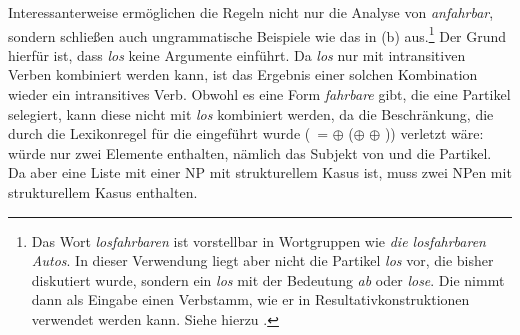 Interessanterweise ermöglichen die Regeln nicht nur die Analyse von \emph{anfahrbar}, sondern
schließen auch ungrammatische Beispiele wie das in (b) aus.\footnote{
  Das Wort \emph{losfahrbaren} ist vorstellbar in Wortgruppen wie \emph{die losfahrbaren Autos}.
  In dieser Verwendung liegt aber nicht die Partikel \emph{los} vor, die bisher diskutiert
  wurde, sondern ein \emph{los} mit der Bedeutung \emph{ab} oder \emph{lose}. Die \bard
  nimmt dann als Eingabe einen Verbstamm, wie er in
  Resultativkonstruktionen verwendet werden 
  kann. Siehe hierzu .%
}
\eal
{}
\zl
Der Grund hierfür ist, dass \emph{los} keine Argumente einführt. Da \emph{los} nur mit intransitiven
Verben kombiniert werden kann, ist das Ergebnis einer solchen Kombination wieder ein intransitives Verb.
Obwohl es eine Form \emph{fahrbare} gibt, die eine Partikel selegiert, kann diese nicht mit \emph{los}
kombiniert werden, da die Beschränkung, die durch die Lexikonregel für die \bard eingeführt wurde
(\, =  $\oplus$  (\etag $\oplus$  $\oplus$ \etag)) 
verletzt wäre:  würde nur zwei Elemente enthalten, nämlich das Subjekt von  und
die Partikel. Da  aber eine Liste mit einer NP mit strukturellem Kasus ist, muss 
zwei NPen mit strukturellem Kasus enthalten.

